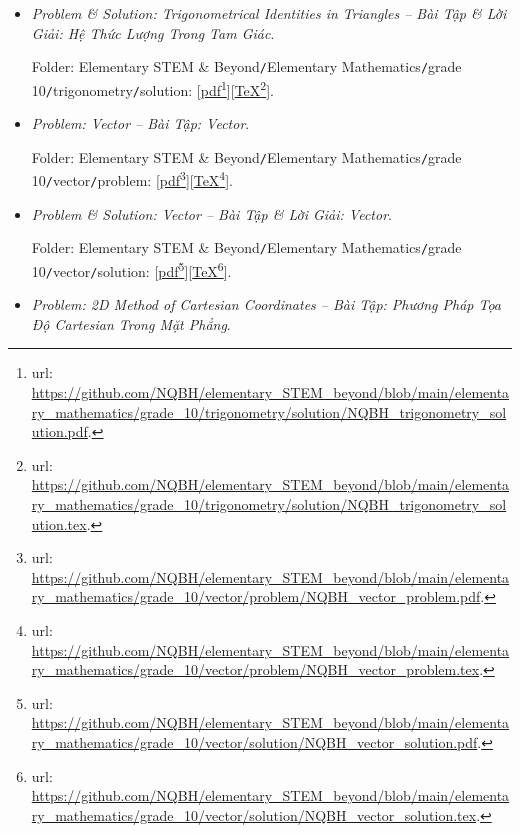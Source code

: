 \documentclass[12pt]{article}
\begin{document}
\begin{itemize}
	\item {\it Problem \& Solution: Trigonometrical Identities in Triangles -- Bài Tập \& Lời Giải: Hệ Thức Lượng Trong Tam Giác}.
	
	Folder: {\sf Elementary STEM \& Beyond{\tt/}Elementary Mathematics{\tt/}grade 10{\tt/}trigonometry{\tt/}solution}: [\href{https://github.com/NQBH/elementary_STEM_beyond/blob/main/elementary_mathematics/grade_10/trigonometry/solution/NQBH_trigonometry_solution.pdf}{pdf}\footnote{{\sc url}: \url{https://github.com/NQBH/elementary_STEM_beyond/blob/main/elementary_mathematics/grade_10/trigonometry/solution/NQBH_trigonometry_solution.pdf}.}][\href{https://github.com/NQBH/elementary_STEM_beyond/blob/main/elementary_mathematics/grade_10/trigonometry/solution/NQBH_trigonometry_solution.tex}{\TeX}\footnote{{\sc url}: \url{https://github.com/NQBH/elementary_STEM_beyond/blob/main/elementary_mathematics/grade_10/trigonometry/solution/NQBH_trigonometry_solution.tex}.}].
	
	\item {\it Problem: Vector -- Bài Tập: Vector}.
	
	Folder: {\sf Elementary STEM \& Beyond{\tt/}Elementary Mathematics{\tt/}grade 10{\tt/}vector{\tt/}problem}: [\href{https://github.com/NQBH/elementary_STEM_beyond/blob/main/elementary_mathematics/grade_10/vector/problem/NQBH_vector_problem.pdf}{pdf}\footnote{{\sc url}: \url{https://github.com/NQBH/elementary_STEM_beyond/blob/main/elementary_mathematics/grade_10/vector/problem/NQBH_vector_problem.pdf}.}][\href{https://github.com/NQBH/elementary_STEM_beyond/blob/main/elementary_mathematics/grade_10/vector/problem/NQBH_vector_problem.tex}{\TeX}\footnote{{\sc url}: \url{https://github.com/NQBH/elementary_STEM_beyond/blob/main/elementary_mathematics/grade_10/vector/problem/NQBH_vector_problem.tex}.}].
	\item {\it Problem \& Solution: Vector -- Bài Tập \& Lời Giải: Vector}.
	
	Folder: {\sf Elementary STEM \& Beyond{\tt/}Elementary Mathematics{\tt/}grade 10{\tt/}vector{\tt/}solution}: [\href{https://github.com/NQBH/elementary_STEM_beyond/blob/main/elementary_mathematics/grade_10/vector/solution/NQBH_vector_solution.pdf}{pdf}\footnote{{\sc url}: \url{https://github.com/NQBH/elementary_STEM_beyond/blob/main/elementary_mathematics/grade_10/vector/solution/NQBH_vector_solution.pdf}.}][\href{https://github.com/NQBH/elementary_STEM_beyond/blob/main/elementary_mathematics/grade_10/vector/solution/NQBH_vector_solution.tex}{\TeX}\footnote{{\sc url}: \url{https://github.com/NQBH/elementary_STEM_beyond/blob/main/elementary_mathematics/grade_10/vector/solution/NQBH_vector_solution.tex}.}].
	\item {\it Problem: 2D Method of Cartesian Coordinates -- Bài Tập: Phương Pháp Tọa Độ Cartesian Trong Mặt Phẳng}.
	

\end{itemize}
\end{document}
